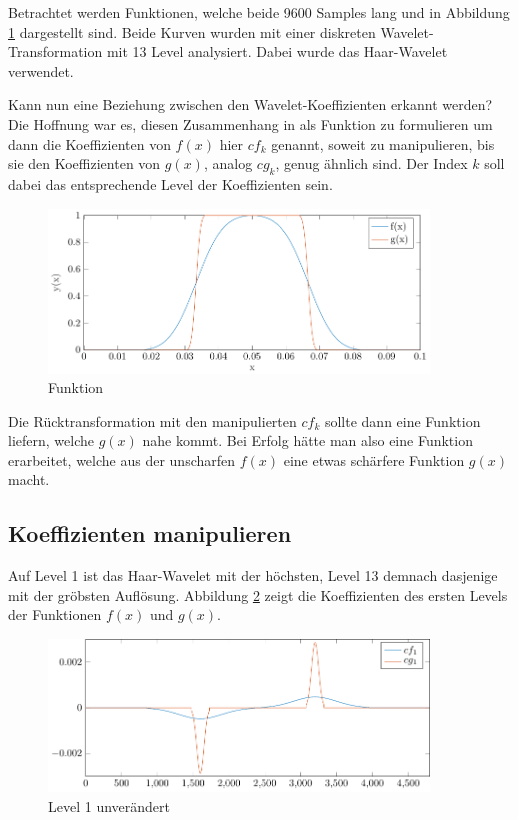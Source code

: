 Betrachtet werden Funktionen, welche beide 9600 Samples lang und in Abbildung \ref{deconvolve:1d} dargestellt sind.
Beide Kurven wurden mit einer diskreten Wavelet-Transformation mit 13 Level analysiert.
Dabei wurde das Haar-Wavelet verwendet.

Kann nun eine Beziehung zwischen den Wavelet-Koeffizienten erkannt werden?
Die Hoffnung war es, diesen Zusammenhang in als Funktion zu formulieren um dann die Koeffizienten von $f(x)$ hier $cf_k$ genannt, soweit zu manipulieren, bis sie den Koeffizienten von $g(x)$, analog $cg_k$, genug ähnlich sind.
Der Index $k$ soll dabei das entsprechende Level der Koeffizienten sein.
\begin{figure}[h]
\centering
\includegraphics[width=0.9\textwidth]{./papers/deconvolve/pictures/1d.pdf}
\caption{Funktion\label{deconvolve:1d}}
\end{figure}
Die Rücktransformation mit den manipulierten $cf_k$ sollte dann eine Funktion liefern, welche $g(x)$ nahe kommt.
Bei Erfolg hätte man also eine Funktion erarbeitet, welche aus der unscharfen $f(x)$ eine etwas schärfere Funktion $g(x)$ macht. 

\subsection{Koeffizienten manipulieren}
Auf Level 1 ist das Haar-Wavelet mit der höchsten, Level 13 demnach dasjenige mit der gröbsten Auflösung.
Abbildung \ref{deconvolve:level1} zeigt die Koeffizienten des ersten Levels der Funktionen $f(x)$ und $g(x)$.
\begin{figure}[h]
\centering
\includegraphics[width=0.9\textwidth]{./papers/deconvolve/pictures/level/level1.pdf}
\caption{Level 1 unverändert\label{deconvolve:level1}}
\end{figure}

